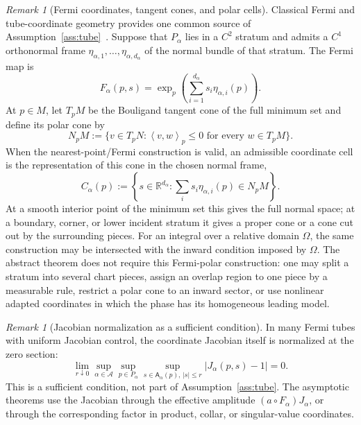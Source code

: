 \documentclass[11pt]{amsart}
\numberwithin{equation}{section}
\theoremstyle{definition}
\theoremstyle{remark}
\newtheorem{remark}[theorem]{Remark}
\newcommand{\R}{\mathbb{R}}
\newcommand{\cA}{\mathcal{A}}
\newcommand{\Afib}{\mathsf{A}}
\newcommand{\inner}[2]{\left\langle #1,#2\right\rangle}
\begin{document}
\begin{remark}[Fermi coordinates, tangent cones, and polar cells]
\label{rem:fermi-polar-cells}
Classical Fermi and tube-coordinate geometry provides one common source of
Assumption~\ref{ass:tube}~\cite{GrayTubes,Federer}.  Suppose that
$P_\alpha$ lies in a $C^2$ stratum and admits a $C^1$ orthonormal frame
$\eta_{\alpha,1},\ldots,\eta_{\alpha,d_\alpha}$ of the normal bundle of that
stratum.  The Fermi map is
\[
  F_\alpha(p,s)=\exp_p\left(\sum_{i=1}^{d_\alpha}s_i\eta_{\alpha,i}(p)\right).
\]
At $p\in M$, let $T_pM$ be the Bouligand tangent cone of the full minimum set
and define its polar cone by
\begin{equation}\label{eq:normal-cone}
  N_pM:=\{v\in T_pN:\inner{v}{w}_p\le0\text{ for every }w\in T_pM\}.
\end{equation}
When the nearest-point/Fermi construction is valid, an admissible coordinate
cell is the representation of this cone in the chosen normal frame,
\[
 C_\alpha(p):=\left\{s\in\R^{d_\alpha}:
      \sum_i s_i\eta_{\alpha,i}(p)\in N_pM\right\}.
\]
At a smooth interior point of the minimum set this gives the full normal space;
at a boundary, corner, or lower incident stratum it gives a proper cone or a
cone cut out by the surrounding pieces.  For an integral over a relative domain
$\Omega$, the same construction may be intersected with the inward condition
imposed by $\Omega$.  The abstract theorem does not require this Fermi-polar
construction: one may split a stratum into several chart pieces, assign an
overlap region to one piece by a measurable rule, restrict a polar cone to an
inward sector, or use nonlinear adapted coordinates in which the phase has its
homogeneous leading model.
\end{remark}

\begin{remark}[Jacobian normalization as a sufficient condition]
\label{rem:jacobian-normalization}
In many Fermi tubes with uniform Jacobian control, the coordinate Jacobian
itself is normalized at the zero section:
\begin{equation}\label{eq:J-uniform}
  \lim_{r\downarrow0}
  \sup_{\alpha\in\cA}\sup_{p\in P_\alpha}
  \sup_{s\in\Afib_\alpha(p),\,|s|\le r}
  |J_\alpha(p,s)-1|=0.
\end{equation}
This is a sufficient condition, not part of Assumption~\ref{ass:tube}.  The
asymptotic theorems use the Jacobian through the effective amplitude
$(a\circ F_\alpha)J_\alpha$, or through the corresponding factor in product,
collar, or singular-value coordinates.
\end{remark}
\end{document}
